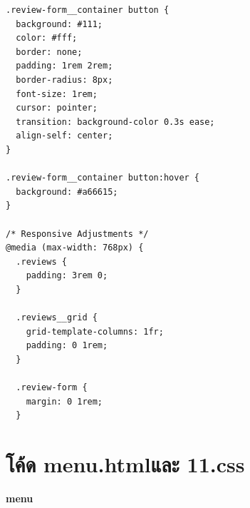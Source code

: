 \documentclass{report}
\begin{document}
\begin{verbatim}
.review-form__container button {
  background: #111;
  color: #fff;
  border: none;
  padding: 1rem 2rem;
  border-radius: 8px;
  font-size: 1rem;
  cursor: pointer;
  transition: background-color 0.3s ease;
  align-self: center;
}
 
.review-form__container button:hover {
  background: #a66615;
}
 
/* Responsive Adjustments */
@media (max-width: 768px) {
  .reviews {
    padding: 3rem 0;
  }
 
  .reviews__grid {
    grid-template-columns: 1fr;
    padding: 0 1rem;
  }
 
  .review-form {
    margin: 0 1rem;
  }
\end{verbatim}

\section{โค้ด menu.htmlและ 11.css}
\textbf{menu}
\end{document}
